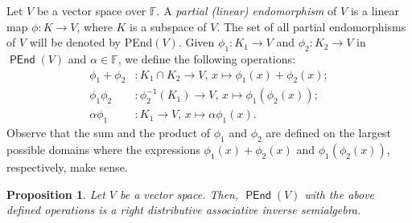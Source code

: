 \documentclass{amsart}
\newcommand{\F}{\mathbb{F}}
\newcommand{\0}{{\vartheta}}
\newtheorem{prop}[thm]{Proposition}
\theoremstyle{definition}
\theoremstyle{remark}
\numberwithin{equation}{section}
\newtheorem*{Theorem A}{\textbf{Theorem A}}
\newtheorem*{Corollary E}{\textbf{Corollary E}}
\newtheorem*{Corollary F}{\textbf{Corollary F}}
\newtheorem*{Theorem B}{\textbf{Theorem B}}
\newtheorem*{Theorem C}{\textbf{Theorem C}}
\newtheorem*{Theorem D}{\textbf{Theorem B}}
\newtheorem*{p a}{\textbf{Proof of  Theorem A}}
\newtheorem*{p b}{\textbf{Proof of Theorem B}}
\newtheorem*{p c}{\textbf{Proof of  Theorem C}}
\newtheorem*{p d}{\textbf{Proof of  Theorem D}}
\DeclareMathOperator{\pen}{\textsf{PEnd}}
\begin{document}
		

 


Let $V$ be a vector space over $\mathbb{F}.$ A {\em partial (linear) endomorphism} of $V$ is a linear map $\phi: K\to V$, where $K$ is a subspace of $V$. The set of all partial endomorphisms of $V$ will be denoted by {\sf PEnd}$(V)$. Given   $\phi_1: K_1\to V$ and $\phi_2: K_2\to V$ in $\pen(V)$ and $\alpha\in \F$, we define the following operations:
\begin{align*}
   \phi_1+\phi_2 &: K_1\cap K_2\to V, \,x\mapsto \phi_1(x)+\phi_2(x); \\
   \phi_1\phi_2 &: \phi_2^{-1}(K_1)\to V, \, x\mapsto \phi_1(\phi_2(x));\\
   \alpha\phi_1 &: K_1\to V, \, x\mapsto \alpha\phi_1(x).
\end{align*}
Observe that the sum and the product of  $\phi_1$ and $\phi_2$ are defined on the largest possible domains  where the expressions $\phi_1(x)+\phi_2(x)$ and $\phi_1(\phi_2(x))$, respectively,  make sense. 
\begin{prop}\label{p20}
Let $V$ be a vector space. Then,  $\pen(V)$ with the above defined operations  is a right distributive associative inverse semialgebra.
\end{prop}
\end{document}
